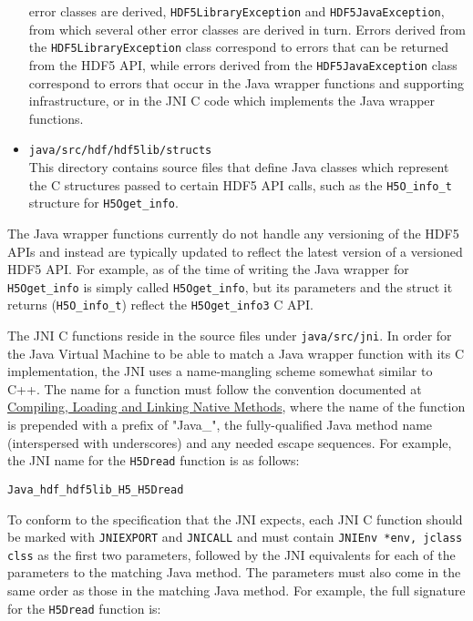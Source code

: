 \begin{itemize}
    error classes are derived, \texttt{HDF5LibraryException} and \texttt{HDF5JavaException}, from which several
    other error classes are derived in turn. Errors derived from the \texttt{HDF5LibraryException} class
    correspond to errors that can be returned from the HDF5 API, while errors derived from the
    \texttt{HDF5JavaException} class correspond to errors that occur in the Java wrapper functions
    and supporting infrastructure, or in the JNI C code which implements the Java wrapper functions.
  \item \texttt{java/src/hdf/hdf5lib/structs} \\
    This directory contains source files that define Java classes which represent the C structures
    passed to certain HDF5 API calls, such as the \texttt{H5O\_info\_t} structure for \texttt{H5Oget\_info}.
\end{itemize}

The Java wrapper functions currently do not handle any versioning of the HDF5 APIs and instead
are typically updated to reflect the latest version of a versioned HDF5 API. For example, as of
the time of writing the Java wrapper for \texttt{H5Oget\_info} is simply called \texttt{H5Oget\_info},
but its parameters and the struct it returns (\texttt{H5O\_info\_t}) reflect the \texttt{H5Oget\_info3}
C API.

The JNI C functions reside in the source files under \texttt{java/src/jni}. In order for the
Java Virtual Machine to be able to match a Java wrapper function with its C implementation, the
JNI uses a name-mangling scheme somewhat similar to C++. The name for a function must follow
the convention documented at \href{https://docs.oracle.com/en/java/javase/17/docs/specs/jni/design.html#compiling-loading-and-linking-native-methods}{Compiling, Loading and Linking Native Methods},
where the name of the function is prepended with a prefix of "Java\_", the fully-qualified Java method
name (interspersed with underscores) and any needed escape sequences. For example, the JNI name for
the \texttt{H5Dread} function is as follows:

\begin{verbatim}
Java_hdf_hdf5lib_H5_H5Dread
\end{verbatim}

To conform to the specification that the JNI expects, each JNI C function should be marked with
\texttt{JNIEXPORT} and \texttt{JNICALL} and must contain \texttt{JNIEnv *env, jclass clss} as the
first two parameters, followed by the JNI equivalents for each of the parameters to the matching
Java method. The parameters must also come in the same order as those in the matching Java method.
For example, the full signature for the \texttt{H5Dread} function is:

